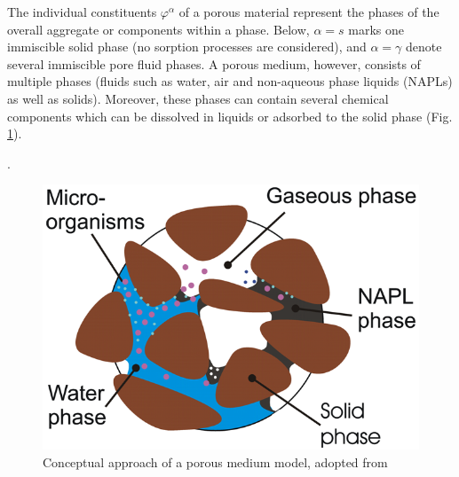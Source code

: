 The individual constituents $\varphi^{\alpha}$ of a porous material represent the phases of the overall aggregate or components within a phase. Below, $\alpha=s$ marks one immiscible solid phase (no sorption processes are considered), and $\alpha=\gamma$ denote several immiscible pore fluid phases. 
%
A porous medium, however, consists of multiple phases (fluids such as water, air and non-aqueous phase liquids (NAPLs) as well as solids). 
Moreover, these phases can contain several chemical components which can be dissolved in liquids or adsorbed to the solid phase (Fig. \ref{fig:porous_medium}).

\newpage
.
\vspace{4cm}
\begin{figure}[htbp]
\hspace{3cm}
\includegraphics[width=0.06\columnwidth]{figures/pm}
\caption{Conceptual approach of a porous medium model, adopted from \cite{Kol:02}}
\label{fig:porous_medium}
\end{figure}

